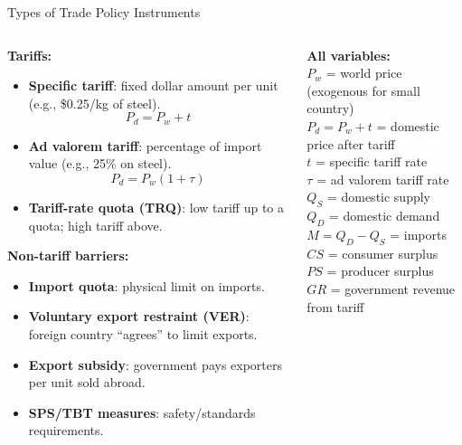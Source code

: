 \documentclass[aspectratio=169]{beamer}
\begin{document}
\begin{frame}{Types of Trade Policy Instruments}
\begin{columns}
\begin{column}{0.52\textwidth}
\textbf{Tariffs:}
\begin{itemize}
  \item \textbf{Specific tariff}: fixed dollar amount per unit (e.g., \$0.25/kg of steel).
    \[P_d = P_w + t\]
  \item \textbf{Ad valorem tariff}: percentage of import value (e.g., 25\% on steel).
    \[P_d = P_w(1+\tau)\]
  \item \textbf{Tariff-rate quota (TRQ)}: low tariff up to a quota; high tariff above.
\end{itemize}
\vspace{0.3em}
\textbf{Non-tariff barriers:}
\begin{itemize}
  \item \textbf{Import quota}: physical limit on imports.
  \item \textbf{Voluntary export restraint (VER)}: foreign country ``agrees'' to limit exports.
  \item \textbf{Export subsidy}: government pays exporters per unit sold abroad.
  \item \textbf{SPS/TBT measures}: safety/standards requirements.
\end{itemize}
\end{column}
\begin{column}{0.45\textwidth}
\begin{varbox}
\small\textbf{All variables:}\\
$P_w$ = world price (exogenous for small country)\\
$P_d = P_w + t$ = domestic price after tariff\\
$t$ = specific tariff rate\\
$\tau$ = ad valorem tariff rate\\
$Q_S$ = domestic supply\\
$Q_D$ = domestic demand\\
$M = Q_D - Q_S$ = imports\\
$CS$ = consumer surplus\\
$PS$ = producer surplus\\
$GR$ = government revenue from tariff
\end{varbox}
\end{column}
\end{columns}
\end{frame}
\end{document}
